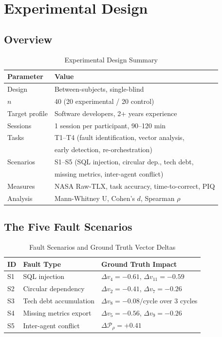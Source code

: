 \documentclass[manuscript,review,anonymous]{acmart}
\begin{document}
\section{Experimental Design}

\subsection{Overview}

\begin{table}[t]
  \caption{Experimental Design Summary}
  \label{tab:design}
  \begin{tabular}{ll}
    \toprule
    Parameter & Value \\
    \midrule
    Design & Between-subjects, single-blind \\
    $n$ & 40 (20 experimental / 20 control) \\
    Target profile & Software developers, 2+ years experience \\
    Sessions & 1 session per participant, 90--120 min \\
    Tasks & T1--T4 (fault identification, vector analysis, \\
           & early detection, re-orchestration) \\
    Scenarios & S1--S5 (SQL injection, circular dep., tech debt, \\
              & missing metrics, inter-agent conflict) \\
    Measures & NASA Raw-TLX, task accuracy, time-to-correct, PIQ \\
    Analysis & Mann-Whitney U, Cohen's $d$, Spearman $\rho$ \\
    \bottomrule
  \end{tabular}
\end{table}

\subsection{The Five Fault Scenarios}

\begin{table}[t]
  \caption{Fault Scenarios and Ground Truth Vector Deltas}
  \label{tab:scenarios}
  \begin{tabular}{p{0.5cm}p{2.5cm}p{4.5cm}}
    \toprule
    ID & Fault Type & Ground Truth Impact \\
    \midrule
    S1 & SQL injection & $\Delta v_4 = -0.61$, $\Delta v_{11} = -0.59$ \\
    S2 & Circular dependency & $\Delta v_2 = -0.41$, $\Delta v_7 = -0.26$ \\
    S3 & Tech debt accumulation & $\Delta v_8 = -0.08/\text{cycle}$ over 3 cycles \\
    S4 & Missing metrics export & $\Delta v_5 = -0.56$, $\Delta v_9 = -0.26$ \\
    S5 & Inter-agent conflict & $\Delta \mathcal{P}_\rho = +0.41$ \\
    \bottomrule
  \end{tabular}
\end{table}
\end{document}
